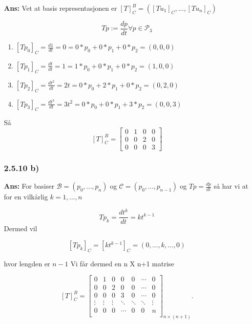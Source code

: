 \documentclass[11pt]{article}
\newenvironment{solbox}
  {\begin{mdframed}[linewidth=1pt,linecolor=black,roundcorner=5pt]
   \noindent\textbf{Ans: }\enspace}
  {\end{mdframed}}
\begin{document}
\begin{solbox}
  Vet at basis representasjonen er $ \left[ T \right]_{C}^{B} = \left( \left[ Tu_1 \right] _C, ..., \left[ Tu_n \right] _C \right)  $ 


  \[
      Tp := \frac{dp} {dt}  \forall p \in \mathcal{ P } _3
  \]

  \begin{enumerate}
    \item $ \left[ Tp_0 \right] _C = \frac{d1} {dt} = 0 = 0*p_0+0*p_1+0*p_2 = \left( 0,0,0 \right) $
    \item $ \left[ Tp_1 \right] _C = \frac{dt} {dt} =1 =1*p_0+0*p_1+0*p_2 = \left( 1,0,0 \right) $ 
    \item $ \left[ Tp_2 \right] _C = \frac{dt^2} {dt} = 2t = 0*p_0+2*p_1+0*p_2 = \left( 0,2,0 \right) $
    \item $ \left[ Tp_3 \right] _C = \frac{dt^3} {dt} = 3t^2 = 0*p_0+0*p_1+3*p_2  = \left( 0,0,3 \right) $    
  \end{enumerate} 

  Så
  \[
      \left[ T \right] _C^B = \begin{bmatrix}
        0&1&0&0 \\
        0&0&2&0 \\
        0&0&0&3
      \end{bmatrix}
  \]
  
  
\end{solbox}

\subsubsection{2.5.10 b)}

\begin{solbox}
  For basiser $ \mathcal{ B } = \left( p_0, ..., p_n \right)  $ og $ \mathcal{ C } = \left( p_0, ..., p_{n-1} \right)   $ og $ Tp=\frac{dp} {dt}  $ så har vi at for en vilkårlig $ k=1,...,n $ 
  
  \[
      Tp_k =  \frac{dt^k} {dt}  = kt^{k-1}
  \]
  Dermed vil 

  \[
      \left[ Tp_k \right]_C = \left[ kt^{k-1} \right]_C = \left( 0,..., k, ..., 0 \right)
  \]

  hvor lengden er $ n-1 $
  Vi får dermed en n X n+1 matrise 
  
  \[
  [T]_C^B =
  \begin{bmatrix}
  0 & 1 & 0 & 0 & 0 & \cdots & 0 \\
  0 & 0 & 2 & 0 & 0 & \cdots & 0 \\
  0 & 0 & 0 & 3 & 0 & \cdots & 0 \\
  \vdots & \vdots & \vdots & \ddots & \ddots & \ddots & \vdots \\
  0 & 0 & 0 & \cdots & 0 & 0 & n \\
  \end{bmatrix}_{n \times (n+1)}.
  \]
  
  
\end{solbox}
\end{document}
